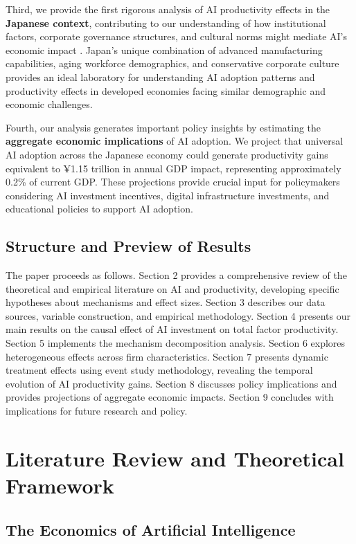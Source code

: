 \documentclass[12pt, a4paper]{article}
\begin{document}
Third, we provide the first rigorous analysis of AI productivity effects in the \textbf{Japanese context}, contributing to our understanding of how institutional factors, corporate governance structures, and cultural norms might mediate AI's economic impact \citep{aoki2019japanese}. Japan's unique combination of advanced manufacturing capabilities, aging workforce demographics, and conservative corporate culture provides an ideal laboratory for understanding AI adoption patterns and productivity effects in developed economies facing similar demographic and economic challenges.

Fourth, our analysis generates important policy insights by estimating the \textbf{aggregate economic implications} of AI adoption. We project that universal AI adoption across the Japanese economy could generate productivity gains equivalent to ¥1.15 trillion in annual GDP impact, representing approximately 0.2\% of current GDP. These projections provide crucial input for policymakers considering AI investment incentives, digital infrastructure investments, and educational policies to support AI adoption.

\subsection{Structure and Preview of Results}

The paper proceeds as follows. Section 2 provides a comprehensive review of the theoretical and empirical literature on AI and productivity, developing specific hypotheses about mechanisms and effect sizes. Section 3 describes our data sources, variable construction, and empirical methodology. Section 4 presents our main results on the causal effect of AI investment on total factor productivity. Section 5 implements the mechanism decomposition analysis. Section 6 explores heterogeneous effects across firm characteristics. Section 7 presents dynamic treatment effects using event study methodology, revealing the temporal evolution of AI productivity gains. Section 8 discusses policy implications and provides projections of aggregate economic impacts. Section 9 concludes with implications for future research and policy.

\section{Literature Review and Theoretical Framework}

\subsection{The Economics of Artificial Intelligence}
\end{document}
